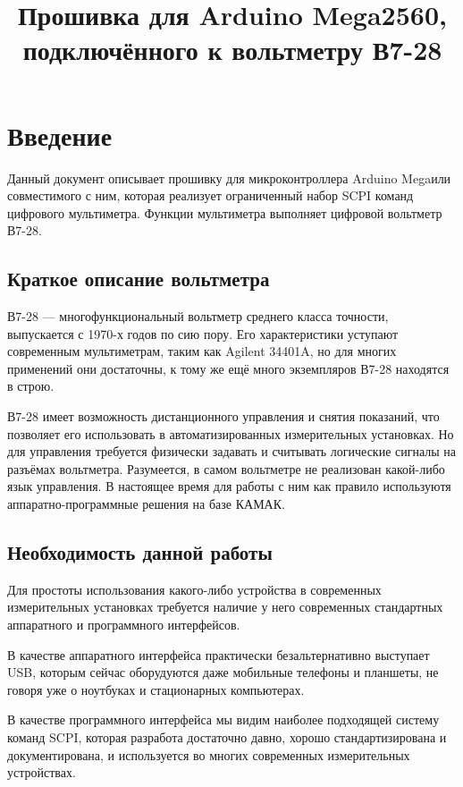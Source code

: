 \documentclass[10pt, a4paper, twocolumn]{article}
\title{Прошивка для Arduino Mega2560, подключённого к вольтметру В7-28}
\newcommand{\SCPI}{\mbox{SCPI}}
\newcommand{\V}{\mbox{В7-28}}
\newcommand{\Arduino}{Arduino Mega}
\begin{document}
\maketitle

\section{Введение}

Данный документ описывает прошивку для микроконтроллера \Arduino или совместимого с ним, которая реализует ограниченный набор \SCPI{} команд цифрового мультиметра. Функции мультиметра выполняет цифровой вольтметр \V.

\subsection{Краткое описание вольтметра}

\V{} --- многофункциональный вольтметр среднего класса точности, выпускается с 1970-х годов по сию пору. Его характеристики уступают современным мультиметрам, таким как Agilent \mbox{34401A}, но для многих применений они достаточны, к тому же ещё много экземпляров \V{} находятся в строю.

\V{} имеет возможность дистанционного управления и снятия показаний, что позволяет его использовать в автоматизированных измерительных установках. Но для управления требуется физически задавать и считывать логические сигналы на разъёмах вольтметра. Разумеется, в самом вольтметре не реализован какой-либо язык управления. В настоящее время для работы с ним как правило используютя аппаратно-программные решения на базе КАМАК.

\subsection{Необходимость данной работы}

Для простоты использования какого-либо устройства в современных измерительных установках требуется наличие у него современных стандартных аппаратного и программного интерфейсов.

В качестве аппаратного интерфейса практически безальтернативно выступает USB, которым сейчас оборудуются даже мобильные телефоны и планшеты, не говоря уже о ноутбуках и стационарных компьютерах.

В качестве программного интерфейса мы видим наиболее подходящей систему команд \SCPI, которая разработа достаточно давно, хорошо стандартизирована и документирована, и используется во многих современных измерительных устройствах.
\end{document}

